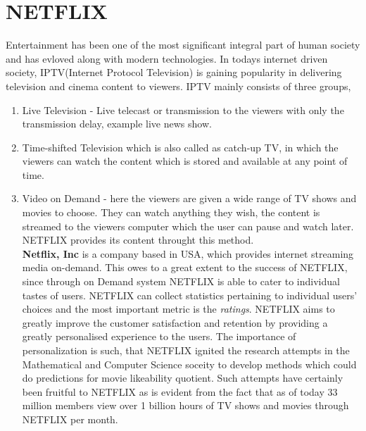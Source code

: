 \section{NETFLIX}
Entertainment has been one of the most significant integral part of human
society and has evloved along with modern technologies. In todays internet
driven society, IPTV(Internet Protocol Television) is gaining popularity in
delivering television and cinema content to viewers. IPTV mainly consists of
three groups, \\
\begin{enumerate}%
\item Live Television - Live telecast or transmission to the viewers with only
the transmission delay, example live news show.
\item Time-shifted Television which is also called as catch-up TV, in which the
viewers can watch the content which is stored and available at any point of
time. 
\item Video on Demand - here the viewers are given a wide range of TV shows and
movies to choose. They can watch anything they wish, the content is streamed to
the viewers computer which the user can pause and watch later. NETFLIX provides
its content throught this method. \\
\textbf{Netflix, Inc} is a company based in USA, which provides internet
streaming media on-demand. This owes to a great extent to the success of
NETFLIX, since through on Demand
system NETFLIX is able to cater to individual tastes of users. NETFLIX can
collect statistics pertaining to individual users' choices and the most
important metric is the \emph{ratings}. NETFLIX aims to greatly improve the
customer satisfaction and retention by providing a greatly personalised
experience to the users. The importance of personalization is such, that NETFLIX
ignited the research attempts in the Mathematical and Computer Science soceity
to develop methods which could do predictions for movie likeability quotient.
Such attempts have certainly been fruitful to NETFLIX as is evident from the
fact that as of today 33 million members view over 1 billion hours of TV shows
and movies through NETFLIX per month.
\end{enumerate}

